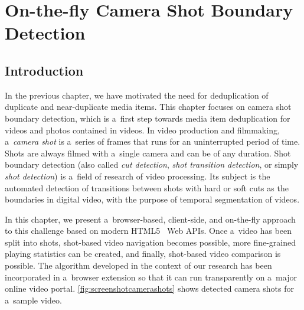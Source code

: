 \chapter{On-the-fly Camera Shot Boundary Detection}
\label{cha:shot-boundary-detection}

\ifpdf
    \graphicspath{{6_shot_boundary_detection/figures/PNG/}{6_shot_boundary_detection/figures/PDF/}{6_shot_boundary_detection/figures/}}
\else
    \graphicspath{{6_shot_boundary_detection/figures/EPS/}{6_shot_boundary_detection/figures/}}
\fi

\section{Introduction} \label{sec:videoshotboundarydetection}

In the previous chapter, we have motivated
the need for deduplication of duplicate and near-duplicate media items.
This chapter focuses on camera shot boundary detection,
which is a~first step towards media item deduplication for videos
and photos contained in videos.
In video production and filmmaking, a~\emph{camera shot} is a~series of frames
that runs for an uninterrupted period of time.
Shots are always filmed with a~single camera and can be of any duration. 
Shot boundary detection (also called \emph{cut detection},
\emph{shot transition detection},
or simply \emph{shot detection}) is a~field of research of video processing.
Its subject is the automated detection of transitions between shots
with hard or soft cuts as the boundaries
in digital video, with the purpose of temporal segmentation of videos.

In this chapter, we present a~browser-based, client-side, and
on-the-fly approach to this challenge
based on modern HTML5~\cite{berjon2012html5} Web APIs.
Once a~video has been split into shots,
shot-based video navigation becomes possible,
more fine-grained playing statistics can be created,
and finally, shot-based video comparison is possible.
The algorithm developed in the context of our research
has been incorporated in a~browser extension
so that it can run transparently on a~major online video portal.
\autoref{fig:screenshotcamerashots} shows detected camera
shots for a~sample video.

